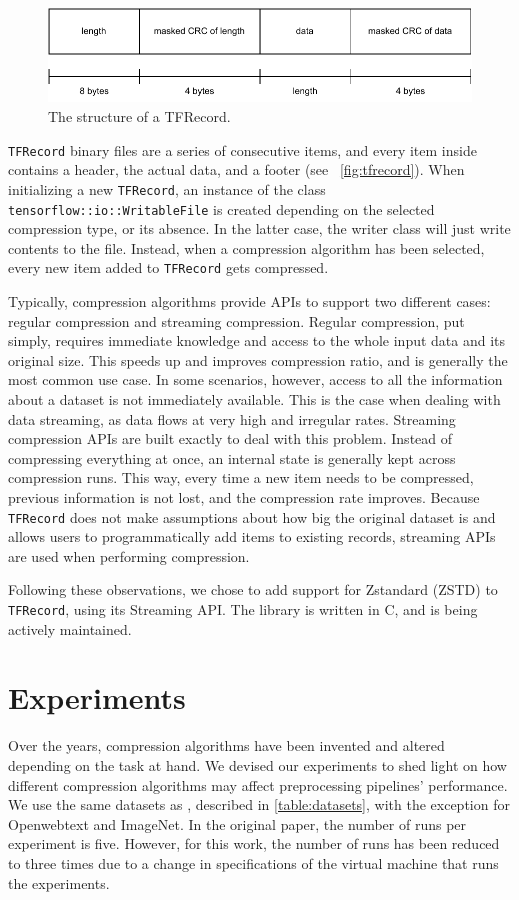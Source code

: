 \documentclass[sigconf,nonacm]{acmart}
\begin{document}
\begin{figure}
  \includegraphics[width=\linewidth]{../images/TFRecord.pdf}
  \caption{The structure of a TFRecord.}
  \Description{}
  \label{fig:tfrecord}
\end{figure}

\texttt{TFRecord} binary files are a series of consecutive items, and every item inside contains a header, the actual data, and a footer (see ~\autoref{fig:tfrecord}).
When initializing a new \texttt{TFRecord}, an instance of the class \texttt{tensorflow::io::WritableFile} is created depending on the selected compression type, or its absence.
In the latter case, the writer class will just write contents to the file.
Instead, when a compression algorithm has been selected, every new item added to \texttt{TFRecord} gets compressed.

Typically, compression algorithms provide APIs to support two different cases: regular compression and streaming compression.
Regular compression, put simply, requires immediate knowledge and access to the whole input data and its original size.
This speeds up and improves compression ratio, and is generally the most common use case.
In some scenarios, however, access to all the information about a dataset is not immediately available.
This is the case when dealing with data streaming, as data flows at very high and irregular rates.
Streaming compression APIs are built exactly to deal with this problem.
Instead of compressing everything at once, an internal state is generally kept across compression runs.
This way, every time a new item needs to be compressed, previous information is not lost, and the compression rate improves.
Because \texttt{TFRecord} does not make assumptions about how big the original dataset is and allows users to programmatically add items to existing records, streaming APIs are used when performing compression.

Following these observations, we chose to add support for Zstandard (ZSTD) to \texttt{TFRecord}, using its Streaming API.
The library is written in C, and is being actively maintained.

\section{Experiments}
Over the years, compression algorithms have been invented and altered depending on the task at hand.
We devised our experiments to shed light on how different compression algorithms may affect preprocessing pipelines' performance.
We use the same datasets as \cite{isenko2022bottleneck}, described in \autoref{table:datasets}, with the exception for Openwebtext and ImageNet.
In the original paper, the number of runs per experiment is five.
However, for this work, the number of runs has been reduced to three times due to a change in specifications of the virtual machine that runs the experiments.
\end{document}
